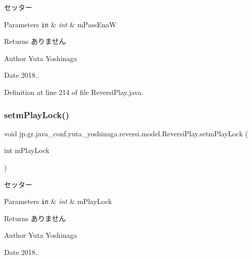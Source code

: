 セッター 


\begin{DoxyParams}[1]{Parameters}
\mbox{\tt in}  & {\em int} & m\+Pass\+EnaW \\
\hline
\end{DoxyParams}
\begin{DoxyReturn}{Returns}
ありません 
\end{DoxyReturn}
\begin{DoxyAuthor}{Author}
Yuta Yoshinaga 
\end{DoxyAuthor}
\begin{DoxyDate}{Date}
2018.. 
\end{DoxyDate}


Definition at line 214 of file Reversi\+Play.\+java.

\mbox{\label{classjp_1_1gr_1_1java__conf_1_1yuta__yoshinaga_1_1reversi_1_1model_1_1_reversi_play_abd7812c4b8e0708b18e666620973b000}} 
\subsubsection{\texorpdfstring{setm\+Play\+Lock()}{setmPlayLock()}}
{\footnotesize\ttfamily void jp.\+gr.\+java\+\_\+conf.\+yuta\+\_\+yoshinaga.\+reversi.\+model.\+Reversi\+Play.\+setm\+Play\+Lock (\begin{DoxyParamCaption}\item[{int}]{m\+Play\+Lock }\end{DoxyParamCaption})}



セッター 


\begin{DoxyParams}[1]{Parameters}
\mbox{\tt in}  & {\em int} & m\+Play\+Lock \\
\hline
\end{DoxyParams}
\begin{DoxyReturn}{Returns}
ありません 
\end{DoxyReturn}
\begin{DoxyAuthor}{Author}
Yuta Yoshinaga 
\end{DoxyAuthor}
\begin{DoxyDate}{Date}
2018.. 
\end{DoxyDate}


